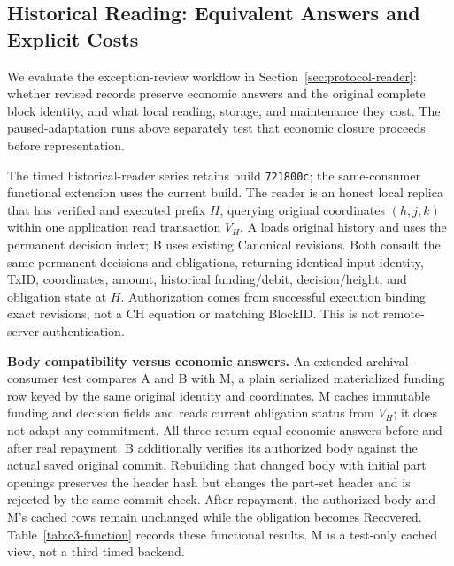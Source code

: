 \subsection{Historical Reading: Equivalent Answers and Explicit Costs}
\label{sec:eval-reader}

We evaluate the exception-review workflow in
Section~\ref{sec:protocol-reader}: whether revised records preserve economic
answers and the original complete block identity, and what local reading,
storage, and maintenance they cost. The paused-adaptation runs above
separately test that economic closure proceeds before representation.

The timed historical-reader series retains build \texttt{721800c}; the same-consumer functional extension uses the current build. The reader is an honest local replica that has verified and executed
prefix $H$, querying original coordinates $(h,j,k)$ within one
application read transaction $V_H$. A loads original history and uses
the permanent decision index; B uses existing Canonical revisions.
Both consult the same permanent decisions and obligations, returning
identical input identity, TxID, coordinates, amount, historical
funding/debit, decision/height, and obligation state at $H$.
Authorization comes from successful execution binding exact revisions,
not a CH equation or matching BlockID. This is not remote-server
authentication.


\noindent\textbf{Body compatibility versus economic answers.}
An extended archival-consumer test compares A and B with M, a plain
serialized materialized funding row keyed by the same original identity
and coordinates. M caches immutable funding and decision fields and reads
current obligation status from $V_H$; it does not adapt any commitment.
All three return equal economic answers before and after real repayment.
B additionally verifies its authorized body against the actual saved
original commit. Rebuilding that changed body with initial part openings
preserves the header hash but changes the part-set header and is rejected
by the same commit check. After repayment, the authorized body and M's
cached rows remain unchanged while the obligation becomes Recovered.
Table~\ref{tab:c3-function} records these functional results. M is a
test-only cached view, not a third timed backend.

